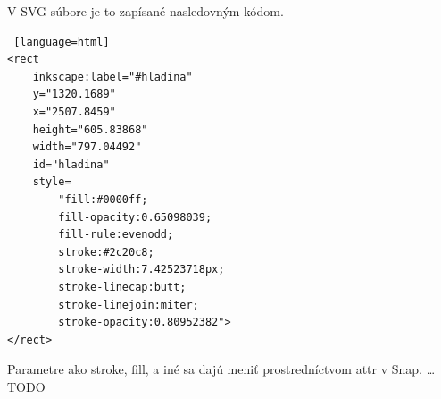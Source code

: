 V SVG súbore je to zapísané nasledovným kódom. 

\begin{lstlisting} [language=html]
<rect
	inkscape:label="#hladina"
	y="1320.1689"
	x="2507.8459"
	height="605.83868"
	width="797.04492"
	id="hladina"
	style=
		"fill:#0000ff;
		fill-opacity:0.65098039;
		fill-rule:evenodd;
		stroke:#2c20c8;
		stroke-width:7.42523718px;
		stroke-linecap:butt;
		stroke-linejoin:miter;
		stroke-opacity:0.80952382">
</rect>
\end{lstlisting}


Parametre ako stroke, fill, a iné sa dajú meniť prostredníctvom attr v Snap. … TODO

